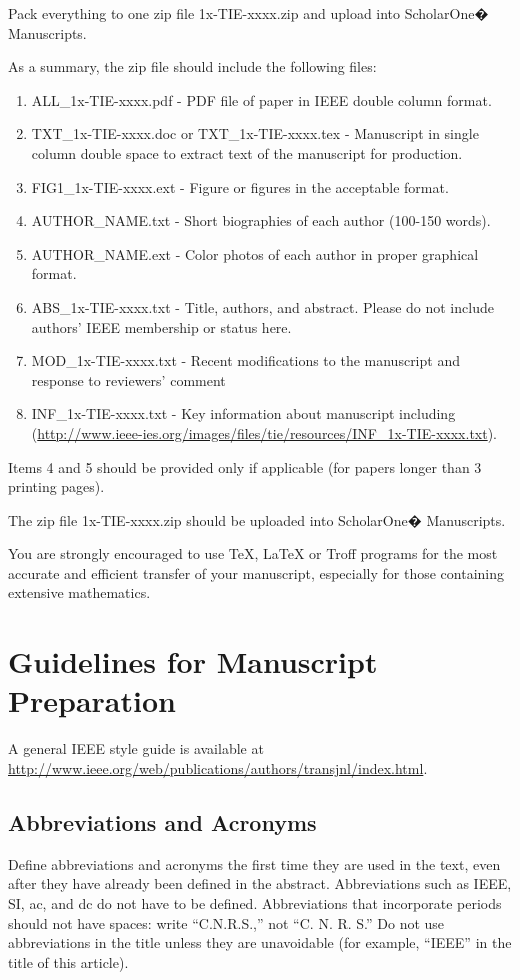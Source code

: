 \documentclass[journal]{IEEEtranTIE}
\begin{document}
Pack everything to one zip file 1x-TIE-xxxx.zip and upload into ScholarOne� Manuscripts.

As a summary, the zip file should include the following files:

\begin{enumerate}[1)]
	\item ALL\_1x-TIE-xxxx.pdf - PDF file of paper in IEEE double column format.
	\item TXT\_1x-TIE-xxxx.doc or TXT\_1x-TIE-xxxx.tex - Manuscript in single column double space to extract text of the manuscript for production.
	\item FIG1\_1x-TIE-xxxx.ext - Figure or figures in the acceptable format.
	\item AUTHOR\_NAME.txt - Short biographies of each author (100-150 words).
	\item AUTHOR\_NAME.ext - Color photos of each author in proper graphical format.
	\item ABS\_1x-TIE-xxxx.txt - Title, authors, and abstract. Please do not include authors' IEEE membership or status here.
	\item MOD\_1x-TIE-xxxx.txt - Recent modifications to the manuscript and response to reviewers' comment
	\item INF\_1x-TIE-xxxx.txt - Key information about manuscript including (\url{http://www.ieee-ies.org/images/files/tie/resources/INF_1x-TIE-xxxx.txt}).
\end{enumerate}

Items 4 and 5 should be provided only if applicable (for papers longer than 3 printing pages).

The zip file 1x-TIE-xxxx.zip should be uploaded into ScholarOne� Manuscripts.

You are strongly encouraged to use TeX, LaTeX or Troff programs for the most accurate and efficient transfer of your manuscript, especially for those containing extensive mathematics.


\section{Guidelines for Manuscript Preparation}
A general IEEE style guide is available at \url{http://www.ieee.org/web/publications/authors/transjnl/index.html}.

\subsection{Abbreviations and Acronyms}
Define abbreviations and acronyms the first time they are used in the text, even after they have already been defined in the abstract. Abbreviations such as IEEE, SI, ac, and dc do not have to be defined. Abbreviations that incorporate periods should not have spaces: write ``C.N.R.S.,'' not ``C. N. R. S.'' Do not use abbreviations in the title unless they are unavoidable (for example, ``IEEE'' in the title of this article).	
\end{document}
